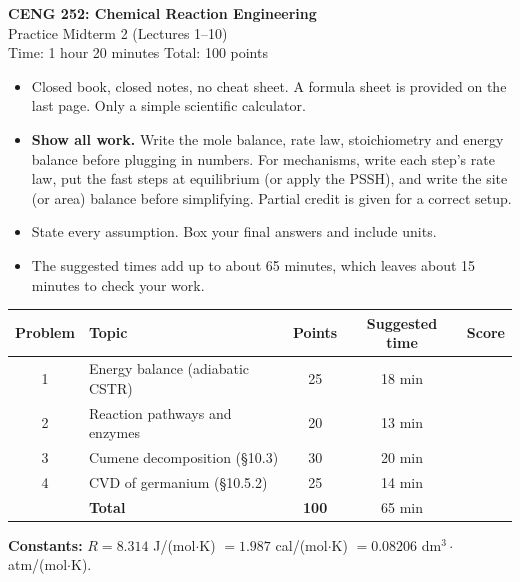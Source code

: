 \documentclass[11pt]{article}
\begin{document}
\begin{center}
{\LARGE\bfseries CENG 252: Chemical Reaction Engineering}\\[6pt]
{\Large Practice Midterm 2 (Lectures 1--10)}\\[4pt]
Time: 1 hour 20 minutes \quad\textbullet\quad Total: 100 points
\end{center}

\begin{tcolorbox}[colback=white,colframe=black!70,title=\textbf{Instructions},fonttitle=\bfseries]
\begin{itemize}[itemsep=2pt]
\item Closed book, closed notes, no cheat sheet. A formula sheet is provided on the last page. Only a simple scientific calculator.
\item \textbf{Show all work.} Write the mole balance, rate law, stoichiometry and energy balance before plugging in numbers.
For mechanisms, write each step's rate law, put the fast steps at equilibrium (or apply the PSSH), and write the site
(or area) balance before simplifying. Partial credit is given for a correct setup.
\item State every assumption. Box your final answers and include units.
\item The suggested times add up to about 65 minutes, which leaves about 15 minutes to check your work.
\end{itemize}
\end{tcolorbox}

\begin{center}
\renewcommand{\arraystretch}{1.35}
\begin{tabular}{clccc}
\toprule
Problem & Topic & Points & Suggested time & Score\\
\midrule
1 & Energy balance (adiabatic CSTR) & 25 & 18 min & \\
2 & Reaction pathways and enzymes & 20 & 13 min & \\
3 & Cumene decomposition (\S10.3) & 30 & 20 min & \\
4 & CVD of germanium (\S10.5.2) & 25 & 14 min & \\
\midrule
 & \textbf{Total} & \textbf{100} & 65 min & \\
\bottomrule
\end{tabular}
\end{center}

\textbf{Constants:} $R=8.314$ J/(mol$\cdot$K) $=1.987$ cal/(mol$\cdot$K) $=0.08206$ dm$^3\cdot$atm/(mol$\cdot$K).
\end{document}
